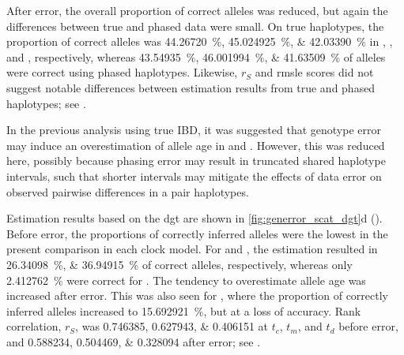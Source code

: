 After error, the overall proportion of correct alleles was reduced, but again the differences between true and phased data were small.
On true haplotypes, the proportion of correct alleles was \SIlist{44.26720;45.024925;42.03390}{\percent} in \ClockM, \ClockR, and \ClockC, respectively, whereas \SIlist{43.54935;46.001994;41.63509}{\percent} of alleles were correct using phased haplotypes.
Likewise, $r_S$ and \gls{rmsle} scores did not suggest notable differences between estimation results from true and phased haplotypes; see .

In the previous analysis using true IBD, it was suggested that genotype error may induce an overestimation of allele age in \ClockM and \ClockC.
However, this was reduced here,
possibly because phasing error may result in truncated shared haplotype intervals, such that shorter intervals may mitigate the effects of data error on observed pairwise differences in a pair haplotypes.

%

%

Estimation results based on the \gls{dgt} are shown in \cref{fig:generror_scat_dgt}{d} ().
Before error, the proportions of correctly inferred alleles were the lowest in the present comparison in each clock model.
For \ClockM and \ClockC, the estimation resulted in \SIlist{26.34098;36.94915}{\percent} of correct alleles, respectively, whereas only \SI{2.412762}{\percent} were correct for \ClockR.
The tendency to overestimate allele age was increased after error.
This was also seen for \ClockR, where the proportion of correctly inferred alleles increased to \SI{15.692921}{\percent}, but at a loss of accuracy.
Rank correlation, $r_S$, was \numlist{0.746385;0.627943;0.406151} at $t_c$, $t_m$, and $t_d$ before error, and \numlist{0.588234;0.504469;0.328094} after error; see .

